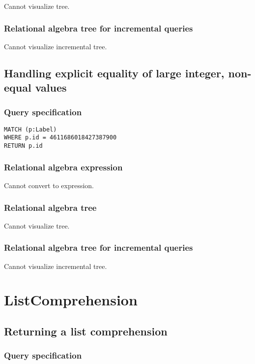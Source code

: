 Cannot visualize tree.

\subsubsection*{Relational algebra tree for incremental queries}

Cannot visualize incremental tree.

\subsection{Handling explicit equality of large integer, non-equal values}

\subsubsection*{Query specification}

\begin{lstlisting}
MATCH (p:Label)
WHERE p.id = 4611686018427387900
RETURN p.id
\end{lstlisting}

\subsubsection*{Relational algebra expression}

Cannot convert to expression.

\subsubsection*{Relational algebra tree}

Cannot visualize tree.

\subsubsection*{Relational algebra tree for incremental queries}

Cannot visualize incremental tree.

\section{ListComprehension}

\subsection{Returning a list comprehension}

\subsubsection*{Query specification}

